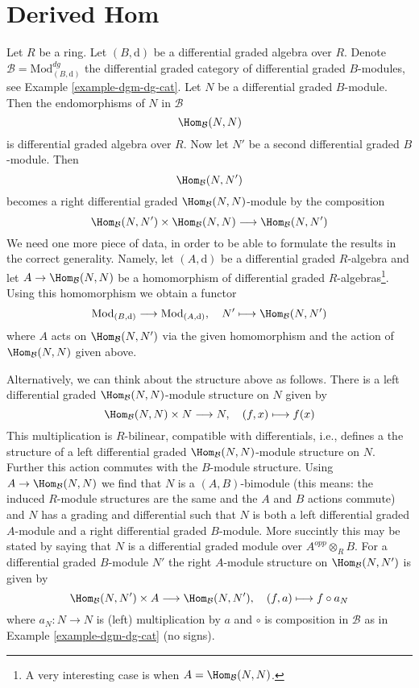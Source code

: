 \section{Derived Hom}
\label{section-restriction}

\noindent
Let $R$ be a ring. Let $(B, \text{d})$ be a differential graded algebra
over $R$. Denote $\mathcal{B} = \text{Mod}^{dg}_{(B, \text{d})}$
the differential graded category of differential graded $B$-modules, see
Example \ref{example-dgm-dg-cat}. Let $N$ be a differential graded $B$-module.
Then the endomorphisms of $N$ in $\mathcal{B}$
$$
\Hom_\mathcal{B}(N, N)
$$
is differential graded algebra over $R$. Now let $N'$ be a second differential
graded $B$-module. Then
$$
\Hom_\mathcal{B}(N, N')
$$
becomes a right differential graded $\Hom_\mathcal{B}(N, N)$-module by the
composition
$$
\Hom_\mathcal{B}(N, N') \times \Hom_\mathcal{B}(N, N)
\longrightarrow
\Hom_\mathcal{B}(N, N')
$$
We need one more piece of data, in order to be able to formulate the
results in the correct generality. Namely, let $(A, \text{d})$ be a
differential graded $R$-algebra and let $A \to \Hom_\mathcal{B}(N, N)$
be a homomorphism of differential graded $R$-algebras\footnote{A very
interesting case is when $A = \Hom_\mathcal{B}(N, N)$.}. Using this
homomorphism we obtain a functor
\begin{equation}
\label{equation-restriction}
\text{Mod}_{(B, \text{d})}
\longrightarrow
\text{Mod}_{(A, \text{d})},\quad
N' \longmapsto \Hom_\mathcal{B}(N, N')
\end{equation}
where $A$ acts on $\Hom_\mathcal{B}(N, N')$ via the given homomorphism
and the action of $\Hom_\mathcal{B}(N, N)$ given above.

\medskip\noindent
Alternatively, we can think about the structure above as follows.
There is a left differential graded $\Hom_\mathcal{B}(N, N)$-module
structure on $N$ given by
$$
\Hom_\mathcal{B}(N, N) \times N \longrightarrow N,\quad
(f, x) \longmapsto f(x)
$$
This multiplication is $R$-bilinear, compatible with differentials,
i.e., defines a the structure of a left differential graded
$\Hom_\mathcal{B}(N, N)$-module structure on $N$. Further this
action commutes with the $B$-module structure. Using
$A \to \Hom_\mathcal{B}(N, N)$ we find that $N$ is a $(A, B)$-bimodule
(this means: the induced $R$-module structures are the same and
the $A$ and $B$ actions commute) and $N$ has a grading and differential
such that $N$ is both a left differential graded $A$-module and
a right differential graded $B$-module. More succintly this may
be stated by saying that $N$ is a differential graded module
over $A^{opp} \otimes_R B$. For a differential graded $B$-module $N'$
the right $A$-module structure on $\Hom_\mathcal{B}(N, N')$ is given by
$$
\Hom_\mathcal{B}(N, N') \times A \longrightarrow \Hom_\mathcal{B}(N, N'),\quad
(f, a) \longmapsto f \circ a_N
$$
where $a_N : N \to N$ is (left) multiplication by $a$ and $\circ$ is
composition in $\mathcal{B}$ as in Example \ref{example-dgm-dg-cat}
(no signs).

